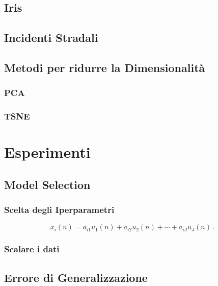 \documentclass[12pt,italian]{report}
\begin{document}
\section{Iris}


\section{Incidenti Stradali}





\section{Metodi per ridurre la Dimensionalità}



\subsection{PCA}
\subsection{TSNE}


% 
% 

\chapter{Esperimenti}
\label{cap3}



\section{Model Selection}

\subsection{Scelta degli Iperparametri}

\begin{equation}
x_i(n) = a_{i1}u_1(n) + a_{i2}u_2(n) + \cdots + a_{iJ}u_J(n) \, .
\label{eq:multimix}
\end{equation}

\subsection{Scalare i dati}


\section{Errore di Generalizzazione}
\label{sec:errore}
\end{document}
